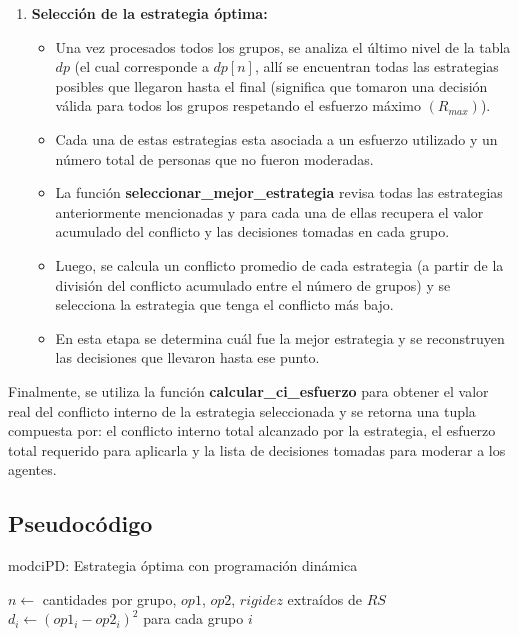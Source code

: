 \documentclass[11pt,letter]{article}
\begin{document}
\begin{itemize}
\begin{enumerate}
\item \textbf{Selección de la estrategia óptima:}
 \begin{itemize}
    \item Una vez procesados todos los grupos, se analiza el último nivel de la tabla $dp$ (el cual corresponde a $dp[n]$, allí se encuentran todas las estrategias posibles que llegaron hasta el final (significa que tomaron una decisión válida para todos los grupos respetando el esfuerzo máximo $(R_{max})$).
    \item Cada una de estas estrategias esta asociada a un esfuerzo utilizado y un número total de personas que no fueron moderadas.
    \item La función \textbf{seleccionar\_mejor\_estrategia} revisa todas las estrategias anteriormente mencionadas y para cada una de ellas recupera el valor acumulado del conflicto y las decisiones tomadas en cada grupo.
    \item Luego, se calcula un conflicto promedio de cada estrategia (a partir de la división del conflicto acumulado entre el número de grupos) y se selecciona la estrategia que tenga el conflicto más bajo.
    \item En esta etapa se determina cuál fue la mejor estrategia y se reconstruyen las decisiones que llevaron hasta ese punto.
\end{itemize}
\end{enumerate}
Finalmente, se utiliza la función \textbf{calcular\_ci\_esfuerzo} para obtener el valor real del conflicto interno de la estrategia seleccionada y se retorna una tupla compuesta por: el conflicto interno total alcanzado por la estrategia, el esfuerzo total requerido para aplicarla y la lista de decisiones tomadas para moderar a los agentes.
    \subsection{Pseudocódigo}
    \begin{algorithm}[H]
    \caption{modciPD: Estrategia óptima con programación dinámica}

    $n \leftarrow$ cantidades por grupo, $op1$, $op2$, $rigidez$ extraídos de $RS$ \\
    $d_i \leftarrow (op1_i - op2_i)^2$ para cada grupo $i$ 


\end{algorithm}
\end{itemize}
\end{document}
